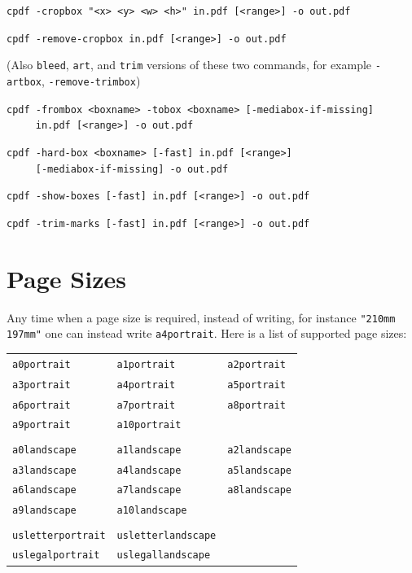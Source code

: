 \documentclass{book}
\newcommand{\smallgap}{\bigskip}
\begin{document}
\begin{framed}
  \vspace{1.5mm}
  \small\noindent\verb!cpdf -cropbox "<x> <y> <w> <h>" in.pdf [<range>] -o out.pdf!

  \vspace{1.5mm}
  \small\noindent\verb!cpdf -remove-cropbox in.pdf [<range>] -o out.pdf!

  \vspace{1.5mm}
  (Also \texttt{bleed}, \texttt{art}, and \texttt{trim} versions of these two commands, for example  \texttt{-artbox}, \texttt{-remove-trimbox})

  \vspace{1.5mm}
  \small\noindent\verb!cpdf -frombox <boxname> -tobox <boxname> [-mediabox-if-missing]! \\
  \noindent\verb!     in.pdf [<range>] -o out.pdf!

  \vspace{1.5mm}
  \small\noindent\verb!cpdf -hard-box <boxname> [-fast] in.pdf [<range>]!\\
  \small\noindent\verb!     [-mediabox-if-missing] -o out.pdf!

  \vspace{1.5mm}
  \small\noindent\verb!cpdf -show-boxes [-fast] in.pdf [<range>] -o out.pdf!

  \vspace{1.5mm}
  \small\noindent\verb!cpdf -trim-marks [-fast] in.pdf [<range>] -o out.pdf!

  \end{framed}

  \section{Page Sizes}
\label{papersizes}
  Any time when a page size is required, instead of writing, for instance \texttt{"210mm 197mm"} one can instead write \texttt{a4portrait}. Here is a list of supported page sizes:

{\small
  \smallgap
  \begin{tabular}{lll}
  \texttt{a0portrait} & \texttt{a1portrait} & \texttt{a2portrait} \\
  \texttt{a3portrait} & \texttt{a4portrait} & \texttt{a5portrait} \\
  \texttt{a6portrait} & \texttt{a7portrait} & \texttt{a8portrait} \\
  \texttt{a9portrait} & \texttt{a10portrait} & \\
  \\
  \texttt{a0landscape} & \texttt{a1landscape} & \texttt{a2landscape} \\
  \texttt{a3landscape} & \texttt{a4landscape} & \texttt{a5landscape} \\
  \texttt{a6landscape} & \texttt{a7landscape} & \texttt{a8landscape} \\
  \texttt{a9landscape} & \texttt{a10landscape} & \\
  \\
  \texttt{usletterportrait} & \texttt{usletterlandscape} & \\
  \texttt{uslegalportrait} & \texttt{uslegallandscape} &
  \end{tabular}
}
\bigskip
\end{document}
